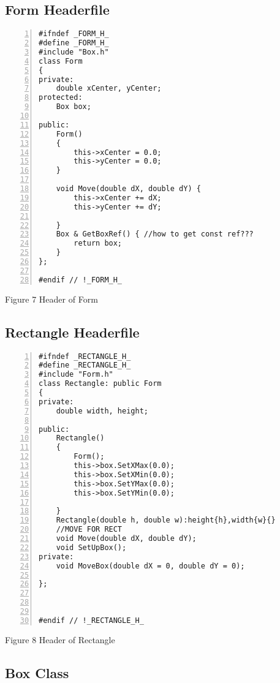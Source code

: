 \documentclass{llncs}
\begin{document}
\subsection{Form Headerfile}
\begin{lstlisting}[basicstyle=\footnotesize\ttfamily, numbers=left, stepnumber=1, numberstyle = \normalsize]
#ifndef _FORM_H_
#define _FORM_H_
#include "Box.h"
class Form
{
private:
	double xCenter, yCenter;  
protected:	
	Box box; 
	
public:
	Form()
	{
		this->xCenter = 0.0;
		this->yCenter = 0.0;
	}
	
	void Move(double dX, double dY) {
		this->xCenter += dX;
		this->yCenter += dY;
		
	}
	Box & GetBoxRef() { //how to get const ref???
		return box; 
	}
};

#endif // !_FORM_H_
\end{lstlisting}
\footnotesize{Figure 7 Header of Form}
\subsection{Rectangle Headerfile}
\begin{lstlisting}[basicstyle=\footnotesize\ttfamily, numbers=left, stepnumber=1, numberstyle = \normalsize]
#ifndef _RECTANGLE_H_
#define _RECTANGLE_H_
#include "Form.h"
class Rectangle: public Form
{
private:
	double width, height; 

public:
	Rectangle() 
	{
		Form();
		this->box.SetXMax(0.0);
		this->box.SetXMin(0.0);
		this->box.SetYMax(0.0);
		this->box.SetYMin(0.0);

	}
	Rectangle(double h, double w):height{h},width{w}{}
	//MOVE FOR RECT
	void Move(double dX, double dY); 
	void SetUpBox();
private:
	void MoveBox(double dX = 0, double dY = 0);
	
};



#endif // !_RECTANGLE_H_
\end{lstlisting}
\footnotesize{Figure 8 Header of Rectangle}
\subsection{Box Class}
\end{document}
